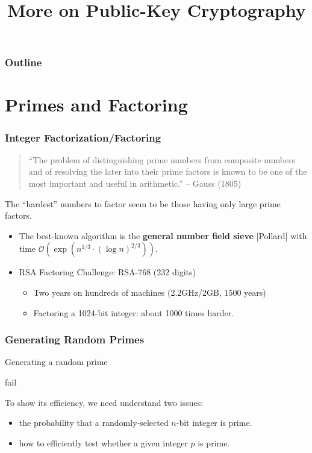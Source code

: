 

\title{More on Public-Key Cryptography}


\maketitle
\begin{frame}
\frametitle{Outline}
\tableofcontents
\end{frame}

\section{Primes and Factoring}
\begin{frame}\frametitle{Integer Factorization/Factoring}
\begin{quote}
``The problem of distinguishing prime numbers from composite numbers and of resolving the later into their prime factors is known to be one of the most important and useful in arithmetic.'' -- Gauss (1805)
\end{quote}

The ``hardest'' numbers to factor seem to be those having only large prime factors.
\begin{itemize}
\item The best-known algorithm is the \textbf{general number field sieve} [Pollard] with time $\mathcal{O}(\exp(n^{1/3}\cdot(\log n)^{2/3}))$.
\item RSA Factoring Challenge: RSA-768 (232 digits)
\begin{itemize}
\item Two years on hundreds of machines (2.2GHz/2GB, 1500 years)
\item Factoring a 1024-bit integer: about 1000 times harder.
\end{itemize}
\end{itemize}
\end{frame}
\begin{frame}\frametitle{Generating Random Primes}
\begin{algorithm}[H]
\DontPrintSemicolon
\caption{Generating a random prime}
\BlankLine
{}
\Return fail
\end{algorithm}
To show its efficiency, we need understand two issues:
\begin{itemize}
\item the probability that a randomly-selected $n$-bit integer is prime.
\item how to efficiently test whether a given integer $p$ is prime.
\end{itemize}
\end{frame}
